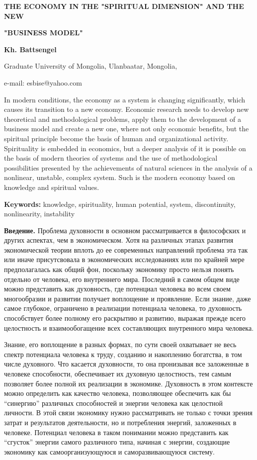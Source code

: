 {\bfseries THE ECONOMY IN THE "SPIRITUAL DIMENSION" AND THE NEW}

{\bfseries "BUSINESS MODEL"}

{\bfseries Kh. Battsengel}

Graduate University of Mongolia, Ulanbaatar, Mongolia,

e-mail: esbise@yahoo.com

In modern conditions, the economy as a system is changing significantly,
which causes its transition to a new economy. Economic research needs to
develop new theoretical and methodological problems, apply them to the
development of a business model and create a new one, where not only
economic benefits, but the spiritual principle become the basis of human
and organizational activity. Spirituality is embedded in economics, but
a deeper analysis of it is possible on the basis of modern theories of
systems and the use of methodological possibilities presented by the
achievements of natural sciences in the analysis of a nonlinear,
unstable, complex system. Such is the modern economy based on knowledge
and spiritual values.

{\bfseries Keywords:} knowledge, spirituality, human potential, system,
discontinuity, nonlinearity, instability

{\bfseries Введение.} Проблема духовности в основном рассматривается в
философских и других аспектах, чем в экономическом. Хотя на различных
этапах развития экономической теории вплоть до ее современных
направлений проблема эта так или иначе присутсвовала в экономических
исследованиях или по крайней мере предполагалась как общий фон,
поскольку экономику просто нельзя понять отдельно от человека, его
внутреннего мира. Последний в самом общем виде можно представить как
духовность, где потенциал человека во всем своем многообразии и развитии
получает воплощение и проявление. Если знание, даже самое глубокое,
ограничено в реализации потенциала человека, то духовность способствует
более полному его раскрытию и развитию, выражая прежде всего целостность
и взаимообогащение всех составляющих внутренного мира человека.

Знание, его воплощение в разных формах, по сути своей охватывает не весь
спектр потенциала человека к труду, созданию и накоплению богатства, в
том числе духовного. Что касается духовности, то она пронизывая все
заложенные в человеке способности, обеспечивает их духовную целостность,
тем самым позволяет более полной их реализации в экономике. Духовность в
этом контексте можно определить как качество человека, позволяющее
обеспечить как бы ``синергию'' различных способностей и энергии человека
как целостной личности. В этой связи экономику нужно рассматривать не
только с точки зрения затрат и результатов деятельности, но и
потребления энергий, заложенных в человеке. Потенциал человека в таком
понимании можно представить как ``сгусток'' энергии самого различного
типа, начиная с энергии, создающие экономику как самоорганизующуюся и
саморазвивающуюся систему.

